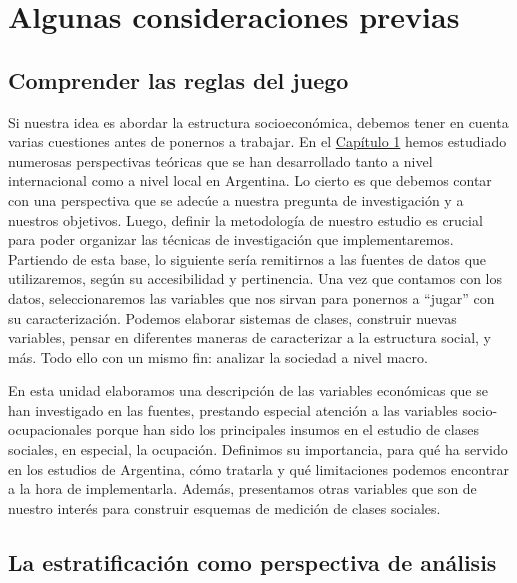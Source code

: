 \documentclass[
]{book}
\begin{document}
\hypertarget{consideraciones}{%
\section{Algunas consideraciones previas}\label{consideraciones}}

\hypertarget{comprender-las-reglas-del-juego}{%
\subsection{Comprender las reglas del juego}\label{comprender-las-reglas-del-juego}}

Si nuestra idea es abordar la estructura socioeconómica, debemos tener en cuenta varias cuestiones antes de ponernos a trabajar. En el \protect\hyperlink{estructura1}{Capítulo 1} hemos estudiado numerosas perspectivas teóricas que se han desarrollado tanto a nivel internacional como a nivel local en Argentina. Lo cierto es que debemos contar con una perspectiva que se adecúe a nuestra pregunta de investigación y a nuestros objetivos. Luego, definir la metodología de nuestro estudio es crucial para poder organizar las técnicas de investigación que implementaremos. Partiendo de esta base, lo siguiente sería remitirnos a las fuentes de datos que utilizaremos, según su accesibilidad y pertinencia. Una vez que contamos con los datos, seleccionaremos las variables que nos sirvan para ponernos a ``jugar'' con su caracterización. Podemos elaborar sistemas de clases, construir nuevas variables, pensar en diferentes maneras de caracterizar a la estructura social, y más. Todo ello con un mismo fin: analizar la sociedad a nivel macro.

En esta unidad elaboramos una descripción de las variables económicas que se han investigado en las fuentes, prestando especial atención a las variables socio-ocupacionales porque han sido los principales insumos en el estudio de clases sociales, en especial, la ocupación. Definimos su importancia, para qué ha servido en los estudios de Argentina, cómo tratarla y qué limitaciones podemos encontrar a la hora de implementarla. Además, presentamos otras variables que son de nuestro interés para construir esquemas de medición de clases sociales.

\hypertarget{la-estratificaciuxf3n-como-perspectiva-de-anuxe1lisis}{%
\subsection{La estratificación como perspectiva de análisis}\label{la-estratificaciuxf3n-como-perspectiva-de-anuxe1lisis}}
\end{document}
